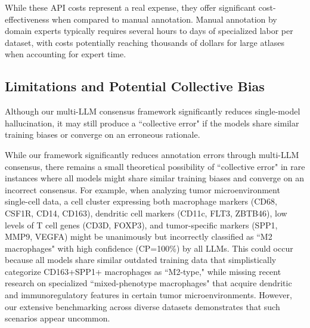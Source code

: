 \documentclass[pdflatex,sn-nature]{sn-jnl}%
\theoremstyle{thmstyleone}%
\theoremstyle{thmstyletwo}%
\theoremstyle{thmstylethree}%
\begin{document}
While these API costs represent a real expense, they offer significant cost-effectiveness when compared to manual annotation. Manual annotation by domain experts typically requires several hours to days of specialized labor per dataset, with costs potentially reaching thousands of dollars for large atlases when accounting for expert time.

\subsection{Limitations and Potential Collective Bias}
Although our multi-LLM consensus framework significantly reduces single-model hallucination, it may still produce a ``collective error" if the models share similar training biases or converge on an erroneous rationale.

While our framework significantly reduces annotation errors through multi-LLM consensus, there remains a small theoretical possibility of ``collective error" in rare instances where all models might share similar training biases and converge on an incorrect consensus. For example, when analyzing tumor microenvironment single-cell data, a cell cluster expressing both macrophage markers (CD68, CSF1R, CD14, CD163), dendritic cell markers (CD11c, FLT3, ZBTB46), low levels of T cell genes (CD3D, FOXP3), and tumor-specific markers (SPP1, MMP9, VEGFA) might be unanimously but incorrectly classified as ``M2 macrophages" with high confidence (CP=100\%) by all LLMs. This could occur because all models share similar outdated training data that simplistically categorize CD163+SPP1+ macrophages as ``M2-type," while missing recent research on specialized ``mixed-phenotype macrophages" that acquire dendritic and immunoregulatory features in certain tumor microenvironments. However, our extensive benchmarking across diverse datasets demonstrates that such scenarios appear uncommon.
\end{document}
